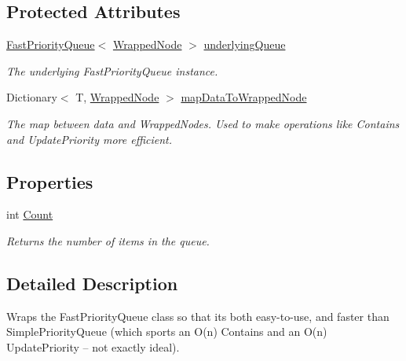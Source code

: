\subsection*{Protected Attributes}
\begin{DoxyCompactItemize}
\item 
\hyperlink{class_priority___queue_1_1_fast_priority_queue}{Fast\+Priority\+Queue}$<$ \hyperlink{class_pathfinding_priority_queue_1_1_wrapped_node}{Wrapped\+Node} $>$ \hyperlink{class_pathfinding_priority_queue_aa100a37883699f322596879886c5d2fd}{underlying\+Queue}
\begin{DoxyCompactList}\small\item\em The underlying Fast\+Priority\+Queue instance. \end{DoxyCompactList}\item 
Dictionary$<$ T, \hyperlink{class_pathfinding_priority_queue_1_1_wrapped_node}{Wrapped\+Node} $>$ \hyperlink{class_pathfinding_priority_queue_aaf27aa2336ffa42a76fc0eb64784a4e8}{map\+Data\+To\+Wrapped\+Node}
\begin{DoxyCompactList}\small\item\em The map between data and Wrapped\+Nodes. Used to make operations like Contains and Update\+Priority more efficient. \end{DoxyCompactList}\end{DoxyCompactItemize}
\subsection*{Properties}
\begin{DoxyCompactItemize}
\item 
int \hyperlink{class_pathfinding_priority_queue_ab19d993982443538e47a52e5740bc476}{Count}
\begin{DoxyCompactList}\small\item\em Returns the number of items in the queue. \end{DoxyCompactList}\end{DoxyCompactItemize}


\subsection{Detailed Description}
Wraps the Fast\+Priority\+Queue class so that it\textquotesingle{}s both easy-\/to-\/use, and faster than Simple\+Priority\+Queue (which sports an O(n) Contains and an O(n) Update\+Priority -- not exactly ideal). 



